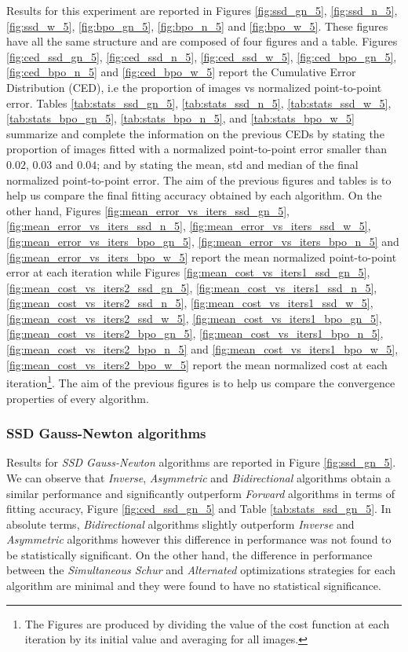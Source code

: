 Results for this experiment are reported in Figures \ref{fig:ssd_gn_5}, \ref{fig:ssd_n_5}, \ref{fig:ssd_w_5}, \ref{fig:bpo_gn_5}, \ref{fig:bpo_n_5} and \ref{fig:bpo_w_5}. These figures have all the same structure and are composed of four figures and a table. Figures \ref{fig:ced_ssd_gn_5}, \ref{fig:ced_ssd_n_5}, \ref{fig:ced_ssd_w_5}, \ref{fig:ced_bpo_gn_5}, \ref{fig:ced_bpo_n_5} and \ref{fig:ced_bpo_w_5} report the Cumulative Error Distribution (CED), i.e the proportion of images vs normalized point-to-point error. Tables \ref{tab:stats_ssd_gn_5}, \ref{tab:stats_ssd_n_5}, \ref{tab:stats_ssd_w_5}, \ref{tab:stats_bpo_gn_5}, \ref{tab:stats_bpo_n_5}, and \ref{tab:stats_bpo_w_5} summarize and complete the information on the previous CEDs by stating the proportion of images fitted with a normalized point-to-point error smaller than $0.02$, $0.03$ and $0.04$; and by stating the mean, std and median of the final normalized point-to-point error. The aim of the previous figures and tables is to help us compare the final fitting accuracy obtained by each algorithm. On the other hand, Figures \ref{fig:mean_error_vs_iters_ssd_gn_5}, \ref{fig:mean_error_vs_iters_ssd_n_5}, \ref{fig:mean_error_vs_iters_ssd_w_5}, \ref{fig:mean_error_vs_iters_bpo_gn_5}, \ref{fig:mean_error_vs_iters_bpo_n_5} and \ref{fig:mean_error_vs_iters_bpo_w_5} report the mean normalized point-to-point error at each iteration while Figures \ref{fig:mean_cost_vs_iters1_ssd_gn_5}, \ref{fig:mean_cost_vs_iters2_ssd_gn_5}, \ref{fig:mean_cost_vs_iters1_ssd_n_5}, \ref{fig:mean_cost_vs_iters2_ssd_n_5}, \ref{fig:mean_cost_vs_iters1_ssd_w_5}, \ref{fig:mean_cost_vs_iters2_ssd_w_5}, \ref{fig:mean_cost_vs_iters1_bpo_gn_5}, \ref{fig:mean_cost_vs_iters2_bpo_gn_5}, \ref{fig:mean_cost_vs_iters1_bpo_n_5}, \ref{fig:mean_cost_vs_iters2_bpo_n_5} and \ref{fig:mean_cost_vs_iters1_bpo_w_5}, \ref{fig:mean_cost_vs_iters2_bpo_w_5} report the mean normalized cost at each iteration\footnote{The Figures are produced by dividing the value of the cost function at each iteration by its initial value and averaging for all images.}. The aim of the previous figures is to help us compare the convergence properties of every algorithm.


\subsubsection{SSD Gauss-Newton algorithms}

Results for \emph{SSD Gauss-Newton} algorithms are reported in Figure \ref{fig:ssd_gn_5}. We can observe that \emph{Inverse}, \emph{Asymmetric} and \emph{Bidirectional} algorithms obtain a similar performance and significantly outperform \emph{Forward} algorithms in terms of fitting accuracy, Figure \ref{fig:ced_ssd_gn_5} and Table \ref{tab:stats_ssd_gn_5}. In absolute terms, \emph{Bidirectional} algorithms slightly outperform \emph{Inverse} and \emph{Asymmetric} algorithms however this difference in performance was not found to be statistically significant. On the other hand, the difference in performance between the \emph{Simultaneous Schur} and \emph{Alternated} optimizations strategies for each algorithm are minimal and they were found to have no statistical significance.


